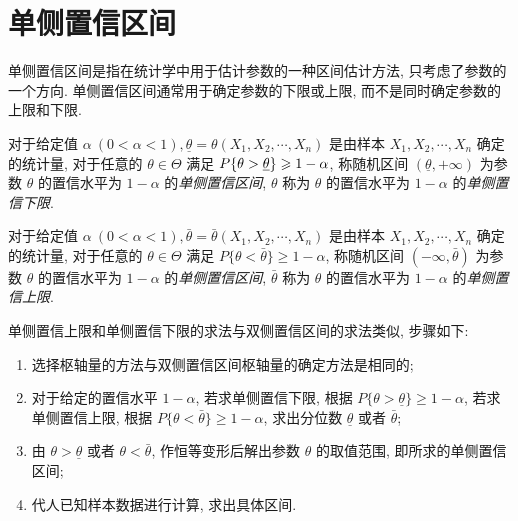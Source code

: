 \section{单侧置信区间}

单侧置信区间是指在统计学中用于估计参数的一种区间估计方法, 只考虑了参数的一个方向. 单侧置信区间通常用于确定参数的下限或上限, 而不是同时确定参数的上限和下限. 

\begin{definition}[单侧置信下限]
    对于给定值 $ \alpha~(0<\alpha<1), \underline{\theta}=\theta\left(X_{1}, X_{2}, \cdots, X_{n}\right) $ 是由样本 $ X_{1}, X_{2}, \cdots, X_{n}$ 确定的统计量, 对于任意的 $ \theta \in \Theta $ 满足 $ P\qty{\theta>\underline{\theta}} \geqslant 1-\alpha$, 称随机区间 $ (\underline{\theta},+\infty) $ 为参数 $ \theta $ 的置信水平为 $ 1-\alpha $ 的\textit{单侧置信区间}, $ \theta $ 称为 $ \theta $ 的置信水平为 $ 1-\alpha $ 的\textit{单侧置信下限}.
\end{definition}

\begin{definition}[单侧置信上限]
    对于给定值 $ \alpha~(0<\alpha<1), \bar{\theta}=\bar{\theta}\left(X_{1}, X_{2}, \cdots, X_{n}\right) $ 是由样本 $ X_{1}, X_{2}, \cdots, X_{n} $ 确定的统计量, 对于任意的 $ \theta \in \Theta $ 满足 $ P\{\theta<\bar{\theta}\} \geqslant 1-\alpha$, 称随机区间 $ (-\infty, \bar{\theta}) $ 为参数 $ \theta $ 的置信水平为 $ 1-\alpha $ 的\textit{单侧置信区间}, $ \bar{\theta} $ 称为 $ \theta $ 的置信水平为 $ 1-\alpha $ 的\textit{单侧置信上限}.
\end{definition}

单侧置信上限和单侧置信下限的求法与双侧置信区间的求法类似, 步骤如下:
\begin{enumerate}[label=(\arabic{*})]
    \item 选择枢轴量的方法与双侧置信区间枢轴量的确定方法是相同的;
    \item 对于给定的置信水平 $ 1-\alpha $, 若求单侧置信下限, 根据 $ P\{\theta>\underline{\theta}\} \geqslant 1-\alpha $, 若求单侧置信上限, 根据 $ P\{\theta<\bar{\theta}\} \geqslant 1-\alpha$, 求出分位数 $ \underline{\theta} $ 或者 $ \bar{\theta} $;
    \item 由 $ \theta>\underline{\theta} $ 或者 $ \theta<\bar{\theta} $, 作恒等变形后解出参数 $ \theta $ 的取值范围, 即所求的单侧置信区间;
    \item 代人已知样本数据进行计算, 求出具体区间.
\end{enumerate}


